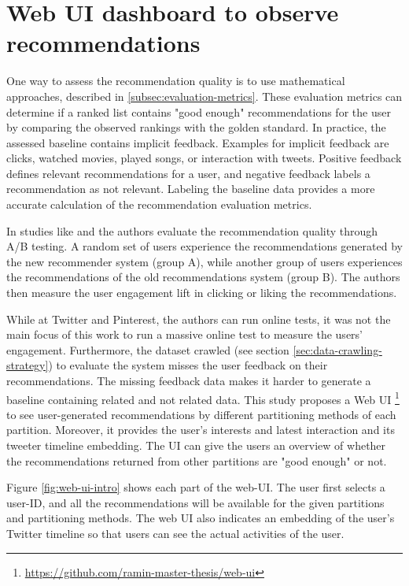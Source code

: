 \section{Web UI dashboard to observe recommendations}
\label{sec:web-ui}
One way to assess the recommendation quality is to use mathematical approaches, described in \ref{subsec:evaluation-metrics}. These evaluation metrics can determine if a ranked list contains "good enough" recommendations for the user by comparing the observed rankings with the golden standard. In practice, the assessed baseline contains implicit feedback. Examples for implicit feedback are clicks, watched movies, played songs, or interaction with tweets. Positive feedback defines relevant recommendations for a user, and negative feedback labels a recommendation as not relevant. Labeling the baseline data provides a more accurate calculation of the recommendation evaluation metrics.


In studies like \cite{eksombatchaiPixieSystemRecommending2018} and \cite{goelWhoToFollowSystemTwitter2015} the authors evaluate the recommendation quality through A/B testing. A random set of users experience the recommendations generated by the new recommender system (group A), while another group of users experiences the recommendations of the old recommendations system (group B). The authors then measure the user engagement lift in clicking or liking the recommendations. 


While at Twitter and Pinterest, the authors can run online tests, it was not the main focus of this work to run a massive online test to measure the users' engagement. Furthermore, the dataset crawled (see section \ref{sec:data-crawling-strategy}) to evaluate the system misses the user feedback on their recommendations. The missing feedback data makes it harder to generate a baseline containing related and not related data. This study proposes a Web UI \footnote{\url{https://github.com/ramin-master-thesis/web-ui}} to see user-generated recommendations by different partitioning methods of each partition. Moreover, it provides the user's interests and latest interaction and its tweeter timeline embedding. The UI can give the users an overview of whether the recommendations returned from other partitions are "good enough" or not.


Figure \ref{fig:web-ui-intro} shows each part of the web-UI. The user first selects a user-ID, and all the recommendations will be available for the given partitions and partitioning methods. The web UI also indicates an embedding of the user's Twitter timeline so that users can see the actual activities of the user. 

